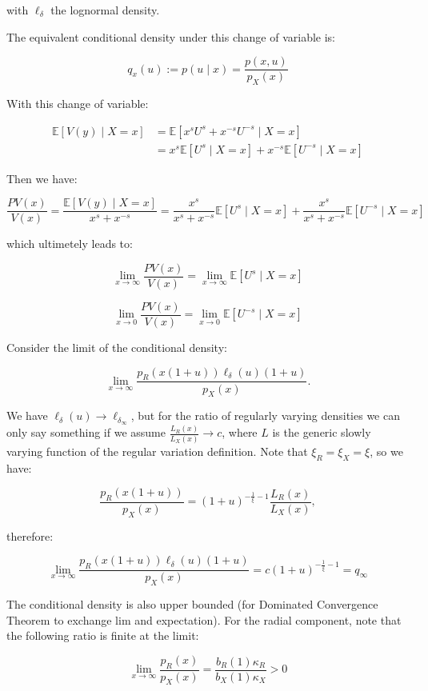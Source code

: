 \documentclass{article}
\begin{document}
with $\ell_\delta$ the lognormal density.

The equivalent conditional density under this change of variable is:

\[
  q_x(u) := p(u \mid x) = \frac{p(x, u)}{p_X(x)}
\]

With this change of variable:

\begin{align*}
  \mathbb{E}[V(y) \mid X = x] &= \mathbb{E}[x^s U^s + x^{-s} U^{-s} \mid X = x] \\
                              &= x^s \mathbb{E}[U^s \mid X = x] + x^{-s} \mathbb{E}[U^{-s} \mid X = x] 
\end{align*}

Then we have:

\[
  \frac{PV(x)}{V(x)} = \frac{\mathbb{E}[V(y) \mid X = x]}{x^s + x^{-s}} = \frac{x^s}{x^s + x^{-s}} \mathbb{E}[U^s \mid X = x] + \frac{x^s}{x^s + x^{-s}} \mathbb{E}[U^{-s} \mid X = x]
\]

which ultimetely leads to:

\[
  \lim_{x \to \infty} \frac{PV(x)}{V(x)} = \lim_{x \to \infty} \mathbb{E}[U^s \mid X = x]
\]

\[
  \lim_{x \to 0} \frac{PV(x)}{V(x)} = \lim_{x \to 0} \mathbb{E}[U^{-s} \mid X = x]
\]

Consider the limit of the conditional density:

\[
  \lim_{x \to \infty} \frac{p_R(x(1+u)) \ell_{\delta}(u) (1+u)}{p_X(x)}.
\]

We have $\ell_\delta(u) \to \ell_{\delta_\infty}$, but for the ratio of regularly varying densities we can only say something if we assume $\frac{L_R(x)}{L_X(x)} \to c$, where $L$ is the generic slowly varying function of the regular variation definition. Note that $\xi_R = \xi_X = \xi$, so we have:

\[
\frac{p_R(x(1+u))}{p_X(x)} = (1+u)^{-\frac{1}{\xi} - 1} \frac{L_R(x)}{L_X(x)},
\]

therefore:

\[
  \lim_{x \to \infty} \frac{p_R(x(1+u)) \ell_{\delta}(u) (1+u)}{p_X(x)} = c (1+u)^{-\frac{1}{\xi} - 1} = q_\infty
\]

The conditional density is also upper bounded (for Dominated Convergence Theorem to exchange lim and expectation). For the radial component, note that the following ratio is finite at the limit:

\[
  \lim_{x \to \infty}\frac{p_R(x)}{p_X(x)} = \frac{b_R(1) \kappa_R}{b_X(1) \kappa_X} > 0
\]
\end{document}
